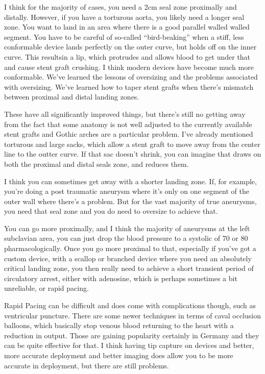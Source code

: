 \documentclass[
]{book}
\begin{document}
I think for the majority of cases, you need a 2cm seal zone proximally
and distally. However, if you have a torturous aorta, you likely need a
longer seal zone. You want to land in an area where there is a good
parallel walled walled segment. You have to be careful of so-called
``bird-beaking'' when a stiff, less conformable device lands perfectly on
the outer curve, but holds off on the inner curve. This resultsin a lip,
which protrudes and allows blood to get under that and cause stent graft
crushing. I think modern devices have become much more conformable.
We've learned the lessons of oversizing and the problems associated with
oversizing. We've learned how to taper stent grafts when there's
mismatch between proximal and distal landing zones.

These have all significantly improved things, but there's still no
getting away from the fact that some anatomy is not well adjusted to the
currently available stent grafts and Gothic arches are a particular
problem. I've already mentioned torturous and large sacks, which allow a
stent graft to move away from the center line to the outter
curve.\citep{iwakoshi2019} If that sac doesn't shrink, you can imagine that
draws on both the proximal and distal seals zone, and reduces them.

I think you can sometimes get away with a shorter landing zone. If, for
example, you're doing a post traumatic aneurysm where it's only on one
segment of the outer wall where there's a problem. But for the vast
majority of true aneurysms, you need that seal zone and you do need to
oversize to achieve that.

You can go more proximally, and I think the majority of aneurysms at the
left subclavian area, you can just drop the blood pressure to a systolic
of 70 or 80 pharmacologically. Once you go more proximal to that,
especially if you've got a custom device, with a scallop or branched
device where you need an absolutely critical landing zone, you then
really need to achieve a short transient period of circulatory arrest,
either with adenosine, which is perhaps sometimes a bit unreliable, or
rapid pacing.

Rapid Pacing can be difficult and does come with complications though,
such as ventricular puncture. There are some newer techniques in terms
of caval occlusion balloons, which basically stop venous blood returning
to the heart with a reduction in output. Those are gaining popularity
certainly in Germany and they can be quite effective for that. I think
having tip capture on devices and better, more accurate deployment and
better imaging does allow you to be more accurate in deployment, but
there are still problems.
\end{document}
